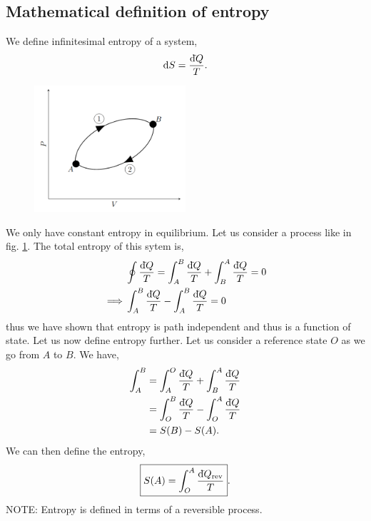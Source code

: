 \documentclass{book}
\newcommand{\dbar}{\mathrm{d}\hspace*{-0.08em}\bar{}\hspace*{0.1em}}
\begin{document}
\subsection{Mathematical definition of entropy}
We define infinitesimal entropy of a system,
\begin{equation}
	\dd{S} = \frac{\dbar Q}{T}.
\end{equation}
\begin{figure}
	\centering
	\includegraphics[width=0.5\textwidth]{cycle.png}
	\caption{}
	\label{fig:cycle}
\end{figure}
We only have constant entropy in equilibrium. Let us consider a process like in fig. \ref{fig:cycle}. The total entropy of this sytem is,
\begin{equation}
	\begin{split}
	&\oint\frac{\dbar Q}{T} = \int_A^B \frac{\dbar Q}{T} + \int_B^A \frac{\dbar Q}{T} = 0 \\
	\implies & \int_A^B \frac{\dbar Q}{T} - \int_A^B \frac{\dbar Q}{T} = 0
	\end{split}
\end{equation}
thus we have shown that entropy is path independent and thus is a function of state. Let us now define entropy further. Let us consider a reference state $O$ as we go from $A$ to $B$. We have,
\begin{equation}
	\begin{split}
		\int_A^B &= \int_A^O \frac{\dbar Q}{T} + \int_B^A \frac{\dbar Q}{T} \\
		& = \int_O^B \frac{\dbar Q}{T} - \int_O^A \frac{\dbar Q}{T}\\
		& = S(B) - S(A).
	\end{split}
\end{equation}
We can then define the entropy,
\begin{equation}
	\boxed{S(A) = \int_O^A \frac{\dbar Q_{\text{rev}}}{T}}.
\end{equation}
NOTE: Entropy is defined in terms of a reversible process.
\end{document}
